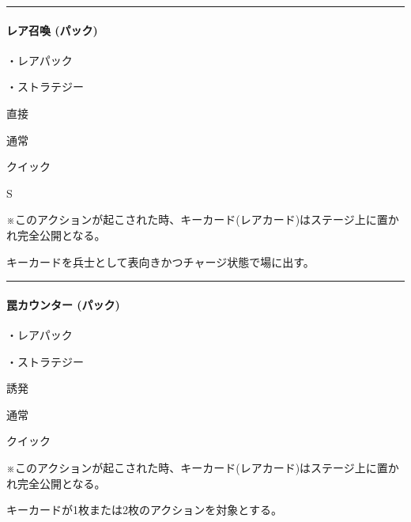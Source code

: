 \documentclass[letterpaper,10pt,dvipdfmx]{sphinxmanual}
\begin{document}
\bigskip\hrule\bigskip



\paragraph{レア召喚 (パック)}
\label{\detokenize{auto/frameActionlist:act-summonsrare}}\label{\detokenize{auto/frameActionlist:id6}}
\sphinxAtStartPar
{}

\sphinxAtStartPar
・レアパック

\sphinxAtStartPar
・ストラテジー

\sphinxAtStartPar
{} 直接

\sphinxAtStartPar
{} 通常

\sphinxAtStartPar
{} クイック

\sphinxAtStartPar
{} S

\sphinxAtStartPar
{} ※このアクションが起こされた時、キーカード(レアカード)はステージ上に置かれ完全公開となる。

\sphinxAtStartPar
{}

\sphinxAtStartPar
キーカードを兵士として表向きかつチャージ状態で場に出す。


\bigskip\hrule\bigskip



\paragraph{罠カウンター (パック)}
\label{\detokenize{auto/frameActionlist:act-trapcounter}}\label{\detokenize{auto/frameActionlist:id7}}
\sphinxAtStartPar
{}

\sphinxAtStartPar
・レアパック

\sphinxAtStartPar
・ストラテジー

\sphinxAtStartPar
{} 誘発

\sphinxAtStartPar
{} 通常

\sphinxAtStartPar
{} クイック

\sphinxAtStartPar
{} ※このアクションが起こされた時、キーカード(レアカード)はステージ上に置かれ完全公開となる。

\sphinxAtStartPar
{}

\sphinxAtStartPar
キーカードが1枚または2枚のアクションを対象とする。
\end{document}
